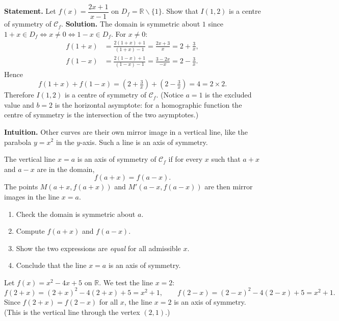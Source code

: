 \documentclass[11pt]{article}
\newcommand{\cle}[1]{{\popxbold\color{popdark}#1}}
\newcounter{popsec}
\newcounter{popsub}
\newcommand{\courssub}[1]{%
  \stepcounter{popsub}%
  \par\vspace{9pt}\noindent{\popxbold\fontsize{11.5}{13}\selectfont\color{popink}{\color{poporange}\thepopsec.\thepopsub}\hspace{6pt}#1}\par\nopagebreak\vspace{4pt}
}
\def\setminus{\mathbin{\backslash}}\let\smallsetminus\setminus
\begin{document}
\begin{exoresolu}
\textbf{Statement.} Let $f(x) = \dfrac{2x+1}{x-1}$ on $D_f = \mathbb{R} \setminus \{1\}$. Show that $I(1, 2)$ is a centre of symmetry of $\mathcal{C}_f$.
\tcblower
\textbf{Solution.} The domain is symmetric about $1$ since $1+x \in D_f \iff x \neq 0 \iff 1-x \in D_f$. For $x \neq 0$:
\begin{align*}
f(1+x) &= \frac{2(1+x)+1}{(1+x)-1} = \frac{2x+3}{x} = 2 + \frac{3}{x}, \\
f(1-x) &= \frac{2(1-x)+1}{(1-x)-1} = \frac{3-2x}{-x} = 2 - \frac{3}{x}.
\end{align*}
Hence
\[ f(1+x) + f(1-x) = \left(2 + \tfrac{3}{x}\right) + \left(2 - \tfrac{3}{x}\right) = 4 = 2 \times 2. \]
Therefore $I(1,2)$ is a centre of symmetry of $\mathcal{C}_f$. (Notice $a=1$ is the excluded value and $b=2$ is the horizontal asymptote: for a homographic function the centre of symmetry is the intersection of the two asymptotes.)
\end{exoresolu}

\courssub{Axis of Symmetry of a Curve}

\textbf{Intuition.} Other curves are their own mirror image in a vertical line, like the parabola $y = x^2$ in the $y$-axis. Such a line is an \cle{axis of symmetry}.

\begin{definition}
The vertical line $x = a$ is an \cle{axis of symmetry} of $\mathcal{C}_f$ if for every $x$ such that $a+x$ and $a-x$ are in the domain,
\[ f(a+x) = f(a-x). \]
The points $M(a+x, f(a+x))$ and $M'(a-x, f(a-x))$ are then mirror images in the line $x = a$.
\end{definition}

\begin{methode}[Proving that the line $x = a$ is an axis of symmetry]
\begin{enumerate}
\item Check the domain is symmetric about $a$.
\item Compute $f(a+x)$ and $f(a-x)$.
\item Show the two expressions are \emph{equal} for all admissible $x$.
\item Conclude that the line $x = a$ is an axis of symmetry.
\end{enumerate}
\end{methode}

\begin{exemplebox}
Let $f(x) = x^2 - 4x + 5$ on $\mathbb{R}$. We test the line $x = 2$:
\[ f(2+x) = (2+x)^2 - 4(2+x) + 5 = x^2 + 1, \qquad f(2-x) = (2-x)^2 - 4(2-x) + 5 = x^2 + 1. \]
Since $f(2+x) = f(2-x)$ for all $x$, the line $x = 2$ is an axis of symmetry. (This is the vertical line through the vertex $(2,1)$.)
\end{exemplebox}
\end{document}

